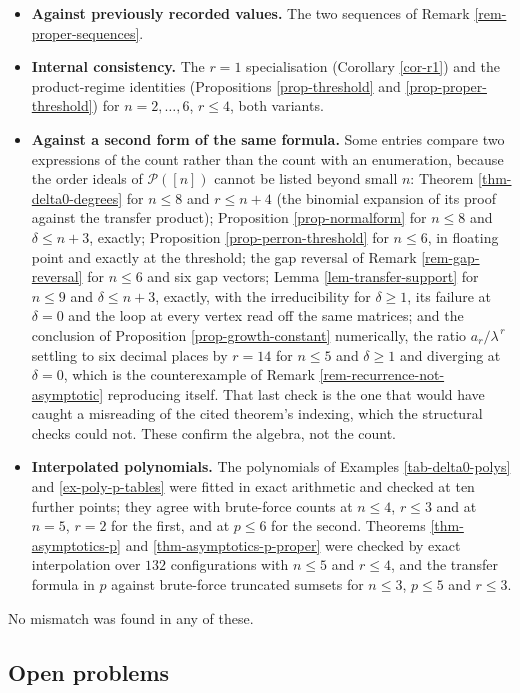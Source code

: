 \documentclass[11pt, a4paper, abstract=yes]{scrartcl}
\theoremstyle{definition}
\theoremstyle{remark}
\theoremstyle{plain}
\begin{document}
\begin{itemize}
\item \textbf{Against previously recorded values.} The two sequences of Remark \ref{rem-proper-sequences}.
\item \textbf{Internal consistency.} The \(r=1\) specialisation (Corollary \ref{cor-r1}) and the product-regime
identities (Propositions \ref{prop-threshold} and \ref{prop-proper-threshold}) for \(n=2,\dots,6\),
\(r\le4\), both variants.
\item \textbf{Against a second form of the same formula.} Some entries compare two expressions of the count
rather than the count with an enumeration, because the order ideals of \(\mathcal P([n])\) cannot
be listed beyond small \(n\): Theorem \ref{thm-delta0-degrees} for \(n\le8\) and \(r\le n+4\) (the
binomial expansion of its proof against the transfer product); Proposition \ref{prop-normalform} for
\(n\le8\) and \(\delta\le n+3\), exactly; Proposition \ref{prop-perron-threshold} for \(n\le6\), in
floating point and exactly at the threshold; the gap reversal of Remark \ref{rem-gap-reversal}
for \(n\le6\) and six gap vectors; Lemma \ref{lem-transfer-support} for \(n\le9\) and
\(\delta\le n+3\), exactly, with the irreducibility for \(\delta\ge1\), its failure at
\(\delta=0\) and the loop at every vertex read off the same matrices; and the conclusion of
Proposition \ref{prop-growth-constant} numerically, the ratio \(a_r/\lambda^{\,r}\) settling to six
decimal places by \(r=14\) for \(n\le5\) and \(\delta\ge1\) and diverging at \(\delta=0\), which
is the counterexample of Remark \ref{rem-recurrence-not-asymptotic} reproducing itself. That last
check is the one that would have caught a misreading of the cited theorem's indexing, which the
structural checks could not. These confirm the algebra, not the count.
\item \textbf{Interpolated polynomials.} The polynomials of Examples \ref{tab-delta0-polys} and
\ref{ex-poly-p-tables} were fitted in exact arithmetic and checked at ten further points; they agree
with brute-force counts at \(n\le4\), \(r\le3\) and at \(n=5\), \(r=2\) for the first, and at
\(p\le6\) for the second. Theorems \ref{thm-asymptotics-p} and \ref{thm-asymptotics-p-proper} were
checked by exact interpolation over \(132\) configurations with \(n\le5\) and \(r\le4\), and the
transfer formula in \(p\) against brute-force truncated sumsets for \(n\le3\), \(p\le5\) and
\(r\le3\).
\end{itemize}

No mismatch was found in any of these.
\subsection{Open problems}
\label{sec:org8fee816}
\end{document}

